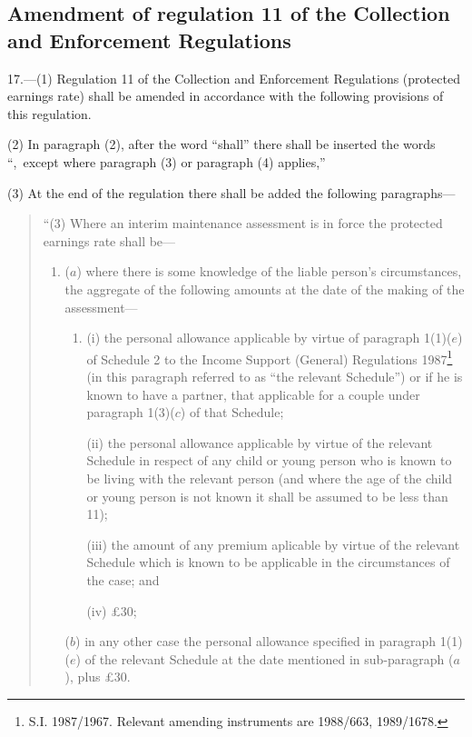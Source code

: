 \documentclass[12pt,a4paper]{article}
\begin{document}
\subsection[17. Amendment of regulation 11 of the Collection and Enforcement Regulations]{Amendment of regulation 11 of the Collection and Enforcement Regulations}

17.—(1) Regulation 11 of the Collection and Enforcement Regulations (protected earnings rate) shall be amended in accordance with the following provisions of this regulation.

(2) In paragraph (2), after the word “shall” there shall be inserted the words ``,~except where paragraph (3) or paragraph (4) applies,”

(3) At the end of the regulation there shall be added the following paragraphs—
\begin{quotation}
“(3) Where an interim maintenance assessment is in force the protected earnings rate shall be—
\begin{enumerate}\item[]
($a$) where there is some knowledge of the liable person’s circumstances, the aggregate of the following amounts at the date of the making of the assessment—
\begin{enumerate}\item[]
(i) the personal allowance applicable by virtue of paragraph 1(1)($e$) of Schedule 2 to the Income Support (General) Regulations 1987\footnote{\frenchspacing S.I. 1987/1967. Relevant amending instruments are 1988/663, 1989/1678.} (in this paragraph referred to as “the relevant Schedule”) or if he is known to have a partner, that applicable for a couple under paragraph 1(3)($c$) of that Schedule;

(ii) the personal allowance applicable by virtue of the relevant Schedule in respect of any child or young person who is known to be living with the relevant person (and where the age of the child or young person is not known it shall be assumed to be less than 11);

(iii) the amount of any premium aplicable by virtue of the relevant Schedule which is known to be applicable in the circumstances of the case; and

(iv) £30;
\end{enumerate}

($b$) in any other case the personal allowance specified in paragraph 1(1)($e$) of the relevant Schedule at the date mentioned in sub-paragraph ($a$), plus £30.
\end{enumerate}


\end{quotation}
\end{document}
